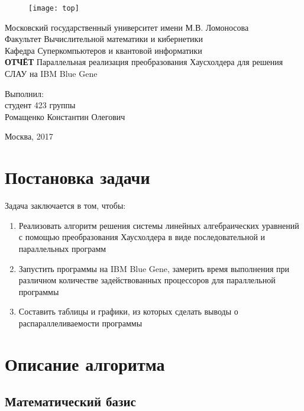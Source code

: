 \documentclass[oneside,final,14pt]{extreport}
\begin{document}
\begin{titlepage}
\begin{figure}[t]
	\centering
	\texttt{[image: top]}
\end{figure}
\begin{centering}
Московский государственный университет имени М.В. Ломоносова\\
Факультет Вычислительной математики и кибернетики\\
Кафедра Суперкомпьютеров и квантовой информатики\\
\vfill
\vfill
\vfill
\LARGE
{\bf ОТЧЁТ}
\vfill
\Large
Параллельная реализация преобразования Хаусхолдера для решения СЛАУ на IBM Blue Gene

\end{centering}
\normalsize
\vfill
\vfill
\vfill
\vfill
\begin{flushright}
Выполнил:\\
студент 423 группы\\
Ромащенко Константин Олегович
\vfill
\end{flushright}
\vfill
\vfill
\vfill
\vfill
\vfill
\centerline{Москва, 2017}

\end{titlepage}

\section*{Постановка задачи}

Задача заключается в том, чтобы:
\begin{enumerate}
\item Реализовать алгоритм решения системы линейных алгебраических уравнений с помощью преобразования Хаусхолдера в виде последовательной и параллельных
программ
\item Запустить программы на IBM Blue Gene, замерить время выполнения при различном количестве задействованных процессоров для параллельной программы
\item Составить таблицы и графики, из которых сделать выводы о распараллеливаемости программы
\end{enumerate}

\section*{Описание алгоритма}

\subsection*{Математический базис}
\end{document}

